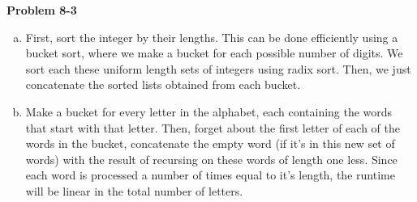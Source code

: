 \documentclass{article}
\begin{document}
\noindent\textbf{Problem 8-3}\\
\begin{enumerate}[a.]
\item
First, sort the integer by their lengths. This can be done efficiently using a bucket sort, where we make a bucket for each possible number of digits. We sort each these uniform length sets of integers using radix sort. Then, we just concatenate the sorted lists obtained from each bucket.

\item
Make a bucket for every letter in the alphabet, each containing the words that start with that letter. Then, forget about the first letter of each of the words in the bucket, concatenate the empty word (if it's in this new set of words) with the result of recursing on these words of length one less. Since each word is processed a number of times equal to it's length, the runtime will be linear in the total number of letters.

\end{enumerate}
\end{document}

